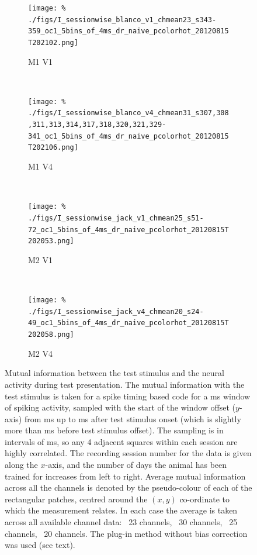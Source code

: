 \begin{figure}[htbp]
    \begin{subfigure}[b]{0.5\linewidth}
        \centering
        \caption{\small{}M1 V1}
        \label{fig:sessb1}
        \texttt{[image: \%
./figs/I\_sessionwise\_blanco\_v1\_chmean23\_s343-359\_oc1\_5bins\_of\_4ms\_dr\_naive\_pcolorhot\_20120815T202102.png]}
    \end{subfigure}
    ~~
    \begin{subfigure}[b]{0.5\linewidth}
        \centering
        \caption{\small{}M1 V4}
        \label{fig:sessb4}
        \texttt{[image: \%
./figs/I\_sessionwise\_blanco\_v4\_chmean31\_s307,308,311,313,314,317,318,320,321,329-341\_oc1\_5bins\_of\_4ms\_dr\_naive\_pcolorhot\_20120815T202106.png]}
    \end{subfigure}
    \\
    \begin{subfigure}[b]{0.5\linewidth}
        \centering
        \caption{\small{}M2 V1}
        \label{fig:sessj1}
        \texttt{[image: \%
./figs/I\_sessionwise\_jack\_v1\_chmean25\_s51-72\_oc1\_5bins\_of\_4ms\_dr\_naive\_pcolorhot\_20120815T202053.png]}
    \end{subfigure}
    ~~
    \begin{subfigure}[b]{0.5\linewidth}
        \centering
        \caption{\small{}M2 V4}
        \label{fig:sessj4}
        \texttt{[image: \%
./figs/I\_sessionwise\_jack\_v4\_chmean20\_s24-49\_oc1\_5bins\_of\_4ms\_dr\_naive\_pcolorhot\_20120815T202058.png]}
    \end{subfigure}
    \caption{\small{}Mutual information between the test stimulus and the neural activity during test presentation.
The mutual information with the test stimulus is taken for a spike timing based code for a \unit[20]{ms} window of spiking activity, sampled with the start of the window offset ($y$-axis) from \unit[0]{ms} up to \unit[500]{ms} after test stimulus onset (which is slightly more than \unit[20]{ms} before test stimulus offset). The sampling is in intervals of \unit[5]{ms}, so any 4 adjacent squares within each session are highly correlated.
The recording session number for the data is given along the $x$-axis, and the number of days the animal has been trained for increases from left to right.
Average mutual information across all the channels is denoted by the pseudo-colour of each of the rectangular patches, centred around the $(x,y)$ co-ordinate to which the measurement relates.
In each case the average is taken across all available channel data: ~23 channels, ~30 channels, ~25 channels, ~20 channels.
The plug-in method without bias correction was used (see text).
}
    \label{fig:sess}
\end{figure}

